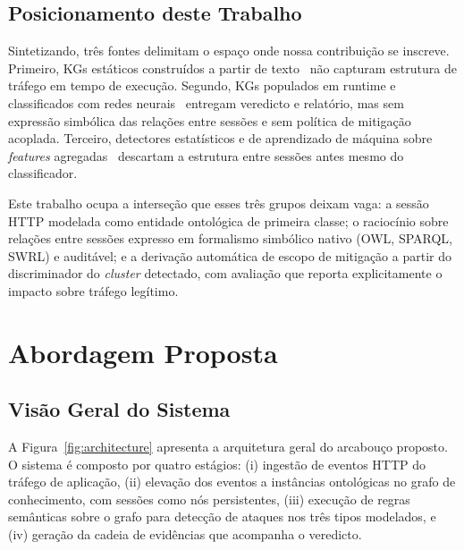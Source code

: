 \documentclass[preprint,12pt]{elsarticle}
\begin{document}
\subsection{Posicionamento deste Trabalho}
\label{sec:related:positioning}

Sintetizando, três fontes delimitam o espaço onde nossa contribuição se inscreve. Primeiro, KGs estáticos construídos a partir de texto~\cite{jia2018practical,bonagiri2024practical,liu2022recent} não capturam estrutura de tráfego em tempo de execução. Segundo, KGs populados em runtime e classificados com redes neurais~\cite{belcastro2025klage} entregam veredicto e relatório, mas sem expressão simbólica das relações entre sessões e sem política de mitigação acoplada. Terceiro, detectores estatísticos e de aprendizado de máquina sobre \emph{features} agregadas~\cite{fernandes2015autonomous,bharathi2012pca,kemp2023approach,odusami2020survey} descartam a estrutura entre sessões antes mesmo do classificador.

Este trabalho ocupa a interseção que esses três grupos deixam vaga: a sessão HTTP modelada como entidade ontológica de primeira classe; o raciocínio sobre relações entre sessões expresso em formalismo simbólico nativo (OWL, SPARQL, SWRL) e auditável; e a derivação automática de escopo de mitigação a partir do discriminador do \emph{cluster} detectado, com avaliação que reporta explicitamente o impacto sobre tráfego legítimo.


\section{Abordagem Proposta}
\label{sec:approach}

\subsection{Visão Geral do Sistema}

A Figura~\ref{fig:architecture} apresenta a arquitetura geral do arcabouço proposto. O sistema é composto por quatro estágios: (i) ingestão de eventos HTTP do tráfego de aplicação, (ii) elevação dos eventos a instâncias ontológicas no grafo de conhecimento, com sessões como nós persistentes, (iii) execução de regras semânticas sobre o grafo para detecção de ataques nos três tipos modelados, e (iv) geração da cadeia de evidências que acompanha o veredicto.
\end{document}
